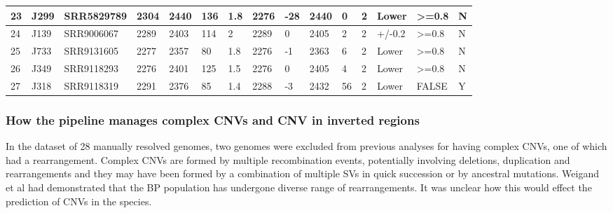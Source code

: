 \documentclass{article}
\begin{document}
{\begin{landscape}
\begin{table}[]
{\begin{tabular}{lllllllllllllll}
\multicolumn{1}{|l|}{23} & \multicolumn{1}{l|}{J299} & \multicolumn{1}{l|}{SRR5829789} & \multicolumn{1}{l|}{2304} & \multicolumn{1}{l|}{2440} & \multicolumn{1}{l|}{136} & \multicolumn{1}{l|}{1.8} & \multicolumn{1}{l|}{2276} & \multicolumn{1}{l|}{-28} & \multicolumn{1}{l|}{2440} & \multicolumn{1}{l|}{0} & \multicolumn{1}{l|}{2} & \multicolumn{1}{l|}{Lower} & \multicolumn{1}{l|}{\textgreater{}=0.8} & \multicolumn{1}{l|}{N} \\ \hline
\multicolumn{1}{|l|}{24} & \multicolumn{1}{l|}{J139} & \multicolumn{1}{l|}{SRR9006067} & \multicolumn{1}{l|}{2289} & \multicolumn{1}{l|}{2403} & \multicolumn{1}{l|}{114} & \multicolumn{1}{l|}{2} & \multicolumn{1}{l|}{2289} & \multicolumn{1}{l|}{0} & \multicolumn{1}{l|}{2405} & \multicolumn{1}{l|}{2} & \multicolumn{1}{l|}{2} & \multicolumn{1}{l|}{+/-0.2} & \multicolumn{1}{l|}{\textgreater{}=0.8} & \multicolumn{1}{l|}{N} \\ \hline
\multicolumn{1}{|l|}{25} & \multicolumn{1}{l|}{J733} & \multicolumn{1}{l|}{SRR9131605} & \multicolumn{1}{l|}{2277} & \multicolumn{1}{l|}{2357} & \multicolumn{1}{l|}{80} & \multicolumn{1}{l|}{1.8} & \multicolumn{1}{l|}{2276} & \multicolumn{1}{l|}{-1} & \multicolumn{1}{l|}{2363} & \multicolumn{1}{l|}{6} & \multicolumn{1}{l|}{2} & \multicolumn{1}{l|}{Lower} & \multicolumn{1}{l|}{\textgreater{}=0.8} & \multicolumn{1}{l|}{N} \\ \hline
\multicolumn{1}{|l|}{26} & \multicolumn{1}{l|}{J349} & \multicolumn{1}{l|}{SRR9118293} & \multicolumn{1}{l|}{2276} & \multicolumn{1}{l|}{2401} & \multicolumn{1}{l|}{125} & \multicolumn{1}{l|}{1.5} & \multicolumn{1}{l|}{2276} & \multicolumn{1}{l|}{0} & \multicolumn{1}{l|}{2405} & \multicolumn{1}{l|}{4} & \multicolumn{1}{l|}{2} & \multicolumn{1}{l|}{Lower} & \multicolumn{1}{l|}{\textgreater{}=0.8} & \multicolumn{1}{l|}{N} \\ \hline
27 & J318 & SRR9118319 & 2291 & 2376 & 85 & 1.4 & 2288 & -3 & 2432 & 56 & 2 & Lower & FALSE & Y \\ \hline
\end{tabular}%
}
\end{table}
    \end{landscape}
    \clearpage%
}


\subsubsection{How the pipeline manages complex CNVs and CNV in inverted regions}
In the dataset of 28 manually resolved genomes, two genomes were excluded from previous analyses for having complex CNVs, one of which had a rearrangement.  Complex CNVs are formed by multiple recombination events, potentially involving deletions, duplication and rearrangements and they may have been formed by a combination of multiple SVs in quick succession or by ancestral mutations. Weigand et al had demonstrated that the BP population has undergone diverse range of rearrangements. It was unclear how this would effect the prediction of CNVs in the species.  
\end{document}
